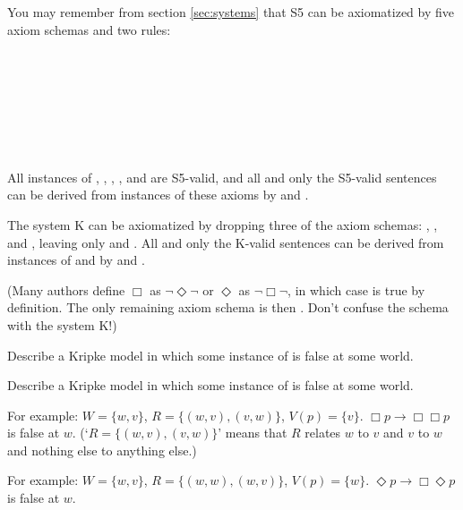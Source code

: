 You may remember from section \ref{sec:systems} that S5 can be axiomatized by
five axiom schemas and two rules:
%
\begin{principles}
  \\
  \\
  \\
  \\
  \\
  \\
\end{principles}
%
All instances of , , , , and  are S5-valid, and
all and only the S5-valid sentences can be derived from instances of these axioms
by  and .

The system K can be axiomatized by dropping three of the axiom schemas: ,
, and , leaving only  and . All and only the K-valid
sentences can be derived from instances of  and  by 
and .

(Many authors define $\Box$ as $\neg\Diamond\neg$ or $\Diamond$ as
$\neg\Box\neg$, in which case  is true by definition. The only
remaining axiom schema is then . Don't confuse the schema  with the
system K!)

\begin{exercise}
  \vspace{3mm}
  \begin{exlist}
    \item Describe a Kripke model in which some instance of  is false at
    some world.
    \item Describe a Kripke model in which some instance of  is false at
    some world.
  \end{exlist}
\end{exercise}
\begin{solution}
  \begin{sollist}
    \item For example: $W = \{ w,v \}$, $R = \{ (w,v), (v,w) \}$,
    $V(p) = \{ v \}$. $\Box p \to \Box\Box p$ is false at $w$.
    (`$R = \{ (w,v), (v,w) \}$' means that $R$ relates $w$ to $v$ and $v$ to $w$
    and nothing else to anything else.)
    \item For example: $W = \{ w,v \}$, $R = \{ (w,w), (w,v) \}$,
    $V(p) = \{ w \}$. $\Diamond p \to \Box\Diamond p$ is false at $w$.
  \end{sollist}
\end{solution}

